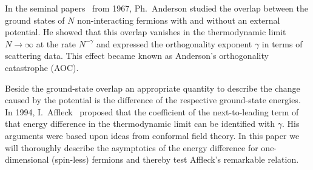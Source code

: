 In the seminal papers~\cite{Anderson1967a,Anderson1967} from 1967, Ph.~Anderson studied the
overlap between the ground states of $N$ non-interacting fermions with and without an external potential.
He showed that this overlap vanishes in the thermodynamic limit $N\to\infty$ at the rate $N^{-\gamma}$ and
expressed the orthogonality exponent $\gamma$ in terms of scattering data. 
This effect became known as Anderson's orthogonality catastrophe (AOC).

Beside the ground-state overlap an appropriate quantity to describe the change caused by the potential 
is the difference of the respective ground-state energies.
In 1994, I.~Affleck~\cite{Affleck1997,AffleckLudwig1994} proposed that the coefficient of the 
next-to-leading term of that energy difference in the thermodynamic limit can be identified with $\gamma$. 
His arguments were based upon ideas from conformal field theory.
In this paper we will thoroughly describe the asymptotics of the energy difference for one-dimensional (spin-less) fermions 
and thereby test Affleck's remarkable relation.


